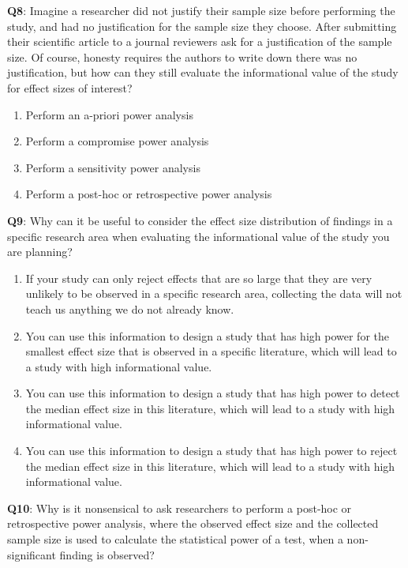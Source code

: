 \documentclass[
  oneside]{book}
\providecommand{\tightlist}{%
  \setlength{\itemsep}{0pt}\setlength{\parskip}{0pt}}
\begin{document}
\textbf{Q8}: Imagine a researcher did not justify their sample size before performing the study, and had no justification for the sample size they choose. After submitting their scientific article to a journal reviewers ask for a justification of the sample size. Of course, honesty requires the authors to write down there was no justification, but how can they still evaluate the informational value of the study for effect sizes of interest?

\begin{enumerate}
\def\labelenumi{\Alph{enumi})}
\tightlist
\item
  Perform an a-priori power analysis
\item
  Perform a compromise power analysis
\item
  Perform a sensitivity power analysis
\item
  Perform a post-hoc or retrospective power analysis
\end{enumerate}

\textbf{Q9}: Why can it be useful to consider the effect size distribution of findings in a specific research area when evaluating the informational value of the study you are planning?

\begin{enumerate}
\def\labelenumi{\Alph{enumi})}
\tightlist
\item
  If your study can only reject effects that are so large that they are very unlikely to be observed in a specific research area, collecting the data will not teach us anything we do not already know.
\item
  You can use this information to design a study that has high power for the smallest effect size that is observed in a specific literature, which will lead to a study with high informational value.
\item
  You can use this information to design a study that has high power to detect the median effect size in this literature, which will lead to a study with high informational value.
\item
  You can use this information to design a study that has high power to reject the median effect size in this literature, which will lead to a study with high informational value.
\end{enumerate}

\textbf{Q10}: Why is it nonsensical to ask researchers to perform a post-hoc or retrospective power analysis, where the observed effect size and the collected sample size is used to calculate the statistical power of a test, when a non-significant finding is observed?
\end{document}
